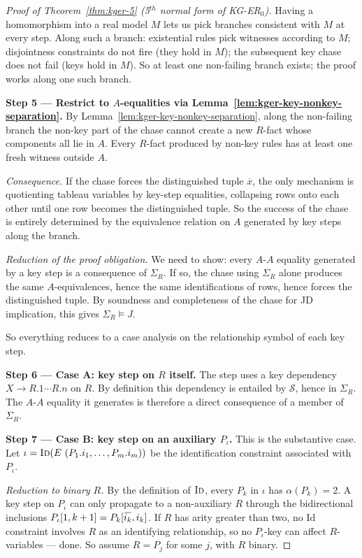 \documentclass[10pt]{article}
\newcommand{\ols}[1]{\mskip.5\thinmuskip\overline{\mskip-.5\thinmuskip {#1} \mskip-.5\thinmuskip}\mskip.5\thinmuskip} %
\begin{document}
\begin{proof}[Proof of Theorem~\ref{thm:kger-5} (5$^{th}$ normal form of KG-ER$_0$)]
Having a homomorphism into a real model \(M\) lets us pick branches
consistent with \(M\) at every step.  Along such a branch: existential
rules pick witnesses according to \(M\); disjointness constraints do
not fire (they hold in \(M\)); the subsequent key chase does not fail
(keys hold in \(M\)).  So at least one non-failing branch exists; the
proof works along one such branch.

\smallskip\noindent\textbf{Step 5 --- Restrict to \(A\)-equalities via
Lemma~\ref{lem:kger-key-nonkey-separation}.}
By Lemma~\ref{lem:kger-key-nonkey-separation}, along the non-failing
branch the non-key part of the chase cannot create a new \(R\)-fact
whose components all lie in \(A\).  Every \(R\)-fact produced by
non-key rules has at least one fresh witness outside \(A\).

\emph{Consequence.}  If the chase forces the distinguished tuple
\(\overline{x}\), the only mechanism is quotienting tableau variables
by key-step equalities, collapsing rows onto each other until one row
becomes the distinguished tuple.  So the success of the chase is
entirely determined by the equivalence relation on \(A\) generated by
key steps along the branch.

\emph{Reduction of the proof obligation.}  We need to show: every
\(A\)-\(A\) equality generated by a key step is a consequence of
\(\Sigma_R\).  If so, the chase using \(\Sigma_R\) alone produces the
same \(A\)-equivalences, hence the same identifications of rows, hence
forces the distinguished tuple.  By soundness and completeness of the
chase for JD implication, this gives \(\Sigma_R\models J\).

So everything reduces to a case analysis on the relationship symbol of
each key step.

\smallskip\noindent\textbf{Step 6 --- Case A: key step on \(R\)
itself.}
The step uses a key dependency \(X\to R.1\cdots R.n\) on \(R\).  By
definition this dependency is entailed by \(\mathcal S\), hence in
\(\Sigma_R\).  The \(A\)-\(A\) equality it generates is therefore a
direct consequence of a member of \(\Sigma_R\).

\smallskip\noindent\textbf{Step 7 --- Case B: key step on an auxiliary
\(P_\iota\).}
This is the substantive case.  Let
\(\iota=\textsc{Id}(E\ (P_1.i_1,\ldots,P_m.i_m))\) be the
identification constraint associated with \(P_\iota\).

\emph{Reduction to binary \(R\).}  By the definition of \(\textsc{Id}\),
every \(P_k\) in \(\iota\) has \(\alpha(P_k)=2\).  A key step on
\(P_\iota\) can only propagate to a non-auxiliary \(R\) through the
bidirectional inclusions \(P_\iota[1,k+1]=P_k[\ols{i_k},i_k]\).  If
\(R\) has arity greater than two, no Id constraint involves \(R\) as
an identifying relationship, so no \(P_\iota\)-key can affect
\(R\)-variables --- done.  So assume \(R=P_j\) for some \(j\), with
\(R\) binary.


\end{proof}
\end{document}
